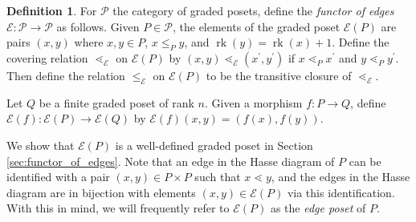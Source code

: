 \documentclass[smallextended, envcountsame, numbook]{svjour3}
\theoremstyle{plain}
\theoremstyle{definition}
\newtheorem{defn}[thm]{Definition}
\theoremstyle{remark}
\numberwithin{equation}{section}
\newcommand\rk{\operatorname{rk}}
\begin{document}
\begin{defn}
\label{defn:functor_of_edges}
For $\mathcal P$ the category of graded posets, define the {\it functor of edges} $\mathcal{E}\colon\mathcal{P} \rightarrow \mathcal{P}$ as follows. Given $P \in \mathcal P$, the elements of the graded poset $\mathcal{E}(P)$ are pairs $(x, y)$ where $x,y\in P$, $x\le_P y$, and $\rk(y) = \rk(x) + 1$. Define the covering relation $\lessdot_{\mathcal{E}}$ on $\mathcal{E}(P)$ by $(x, y) \lessdot_{\mathcal{E}} (x^\prime, y^\prime)$ if $x\lessdot_P x^\prime$ and $y\lessdot_P y^\prime$. Then define the relation $\le_{\mathcal{E}}$ on $\mathcal{E}(P)$ to be the transitive closure of $\lessdot_{\mathcal{E}}$.

Let $Q$ be a finite graded poset of rank $n$. Given a morphism $f\colon P\rightarrow Q$, define $\mathcal{E}(f)\colon \mathcal{E}(P)\rightarrow \mathcal{E}(Q)$ by $\mathcal{E}(f)(x,y) = (f(x), f(y))$.
\end{defn}

We show that $\mathcal{E}(P)$ is a well-defined graded poset in Section \ref{sec:functor_of_edges}.  Note that an edge in the Hasse diagram of $P$ can be identified with a pair $(x,y)\in P\times P$ such that $x\lessdot y$, and the edges in the Hasse diagram are in bijection with elements $(x,y)\in \mathcal E(P)$ via this identification.  With this in mind, we will frequently refer to $\mathcal{E}(P)$ as the {\it edge poset} of $P$. 
\end{document}
